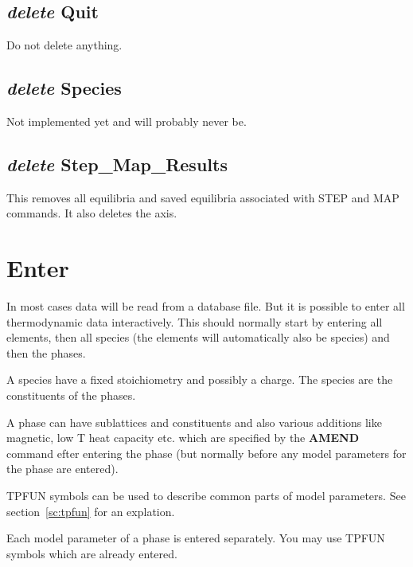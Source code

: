 \documentclass[11pt]{article}
\begin{document}
\hypertarget{Delete quit}{}
\subsection{{\em delete} Quit}

Do not delete anything.

\hypertarget{Delete species}{}
\subsection{{\em delete} Species}

Not implemented yet and will probably never be.

\hypertarget{Delete step-map-results}{}
\subsection{{\em delete} Step\_Map\_Results}

This removes all equilibria and saved equilibria associated with
STEP and MAP commands.  It also deletes the axis.

\hypertarget{Enter}{}
\section{Enter }

In most cases data will be read from a database file.  But it is
possible to enter all thermodynamic data interactively.  This should
normally start by entering all elements, then all species (the
elements will automatically also be species) and then the phases.

A species have a fixed stoichiometry and possibly a charge.  The
species are the constituents of the phases.

A phase can have sublattices and constituents and also various
additions like magnetic, low T heat capacity etc. which are specified
by the {\bf AMEND} command efter entering the phase (but normally
before any model parameters for the phase are entered).

TPFUN symbols can be used to describe common parts of model
parameters.  See section~\ref{sc:tpfun} for an explation.

Each model parameter of a phase is entered separately.  You may use
TPFUN symbols which are already entered.
\end{document}
